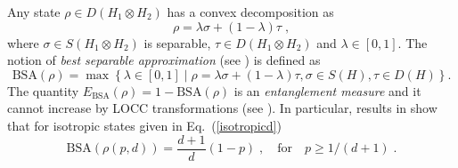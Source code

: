 \documentclass[a4paper,onecolumn,accepted=2024-12-14]{quantumarticle}
\theoremstyle{plain}
\newcommand{\quadtext}[1]{\quad\text{#1}\quad}
\begin{document}
Any state $\rho\in D(H_1\otimes H_2)$ has a convex decomposition as
\begin{equation}\label{bsa1}
\rho=\lambda\sigma+(1-\lambda)\tau\;,
\end{equation}
where $\sigma\in S(H_1\otimes H_2)$ is separable, $\tau\in D(H_1\otimes H_2)$ and $\lambda\in[0,1]$. The notion of \textit{best separable approximation} (see \cite{BSA}) is defined as
\begin{equation}\label{bsa2}
    \mathrm{BSA}(\rho)=\max\left\{\lambda\in[0,1]\mid \rho=\lambda\sigma+(1-\lambda)\tau, \sigma\in S(H), \tau\in D(H)\right\}.
\end{equation}
The quantity $E_{\mathrm{BSA}}(\rho)=1-\mathrm{BSA}(\rho)$ is an \textit{entanglement measure} and it cannot increase by LOCC transformations (see \cite{pleniovirmani}).
In particular, results in \cite{BSAisotropic} show that for isotropic states given in Eq.~(\ref{isotropicd})
\begin{equation}\label{bsaisotropic}
\mathrm{BSA}(\rho(p,d))=\frac{d+1}{d}(1-p)\;,
\quadtext{for} p\geq 1/(d+1)\;.
\end{equation}
\end{document}
